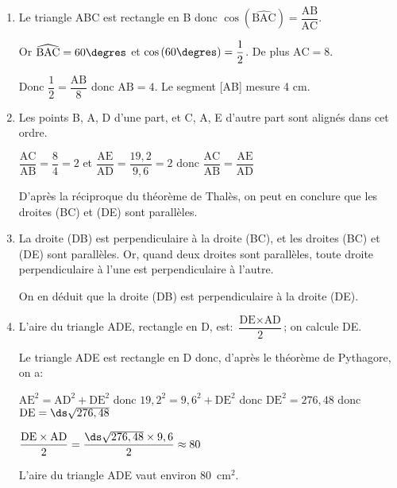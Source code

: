 \begin{enumerate}
\item %
Le triangle ABC est rectangle en B donc
$\cos \left ( \widehat{\text{BAC}} \right )=\dfrac{\text{AB}}{\text{AC}}$.

Or $\widehat{\text{BAC}}=60\degres$ et $\cos \left (60\degres\right )=\dfrac{1}{2}$.
De plus $\text{AC}=8$.

Donc
$\dfrac{1}{2}= \dfrac{\text{AB}}{8}$
donc $\text{AB}=4$.
Le segment [AB] mesure 4 cm.

\item%
Les points B, A, D d'une part, et C, A, E d'autre part sont alignés dans cet ordre.

$\dfrac{\text{AC}}{\text{AB}} = \dfrac{8}{4}=2$
et
$\dfrac{\text{AE}}{\text{AD}} = \dfrac{19,2}{9,6}=2$
donc
$\dfrac{\text{AC}}{\text{AB}} = \dfrac{\text{AE}}{\text{AD}}$

D'après la réciproque du théorème de Thalès, on peut en conclure que les droites (BC) et (DE) sont parallèles.

\item%
La droite (DB) est perpendiculaire à la droite (BC), et les droites (BC) et (DE) sont parallèles.
Or, quand deux droites sont parallèles, toute droite perpendiculaire à l'une est perpendiculaire à l'autre.

On en déduit que  la droite (DB) est perpendiculaire à la droite (DE).

\item L'aire du triangle ADE, rectangle en D, est:
$\dfrac{\text{DE}\times \text{AD}}{2}$; on calcule DE.

Le triangle ADE est rectangle en D donc, d'après le théorème de Pythagore, on a:

$\text{AE}^2 = \text{AD}^2 + \text{DE}^2$
donc
$19,2^2 = 9,6^2 + \text{DE}^2$ 
donc
$\text{DE}^2 = 276,48$ donc $\text{DE}= \ds\sqrt{276,48}$

$\dfrac{\text{DE}\times \text{AD}}{2}=\dfrac{\ds\sqrt{276,48}\times 9,6}{2}
\approx 80$

L'aire du triangle ADE vaut environ 80~cm$^2$.

\end{enumerate}


